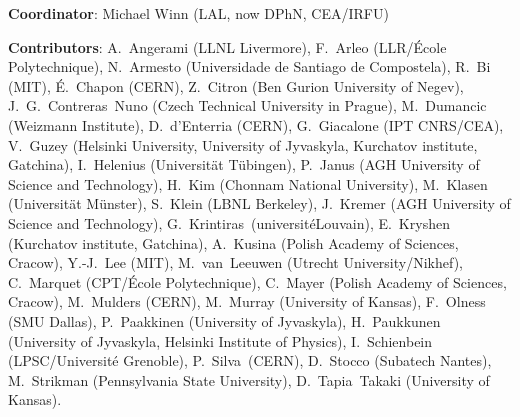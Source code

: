{ \small
\noindent \textbf{Coordinator}: Michael Winn (LAL, now DPhN, CEA/IRFU) %

\noindent \textbf{Contributors}:
A.~Angerami (LLNL Livermore), %
F.~Arleo (LLR/{\'E}cole Polytechnique), %
N.~Armesto (Universidade de Santiago de Compostela), %
R.~Bi (MIT), %
{\'E}.~Chapon (CERN), %
Z.~Citron (Ben Gurion University of Negev), %
J.~G.~Contreras~Nuno (Czech Technical University in Prague),  %
M.~Dumancic (Weizmann Institute),
D.~d'Enterria (CERN), %
G.~Giacalone (IPT CNRS/CEA), %
V.~Guzey (Helsinki University, University of Jyvaskyla, Kurchatov institute, Gatchina),%
I.~Helenius (Universit\"{a}t T\"{u}bingen), %
P.~Janus (AGH University of Science and Technology),
H.~Kim (Chonnam National University), 
M.~Klasen (Universit\"{a}t M\"{u}nster), %
S.~Klein (LBNL Berkeley), %
J.~Kremer (AGH University of Science and Technology),
G.~Krintiras~(universit\'{e}Louvain),
E.~Kryshen (Kurchatov institute, Gatchina), %
A.~Kusina (Polish Academy of Sciences, Cracow), %
Y.-J.~Lee (MIT), %
M.~van~Leeuwen (Utrecht University/Nikhef), %
C.~Marquet (CPT/{\'E}cole Polytechnique), %
C.~Mayer  (Polish Academy of Sciences, Cracow), %
M.~Mulders (CERN),
M.~Murray (University of Kansas), %
F.~Olness (SMU Dallas), %
P.~Paakkinen (University of Jyvaskyla), %
H.~Paukkunen (University of Jyvaskyla, Helsinki Institute of Physics), %
I.~Schienbein (LPSC/Universit{\'e} Grenoble),
P.~Silva~(CERN), %
D.~Stocco (Subatech Nantes), %
M.~Strikman (Pennsylvania State University), %
D.~Tapia~Takaki (University of Kansas). %
}

